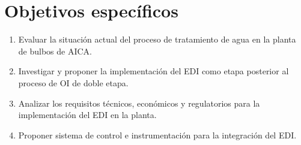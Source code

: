 \section*{Objetivos específicos}
\begin{enumerate}
    \item Evaluar la situación actual del proceso de tratamiento de agua en la planta de bulbos de AICA.
    \item Investigar y proponer la implementación del EDI como etapa posterior al proceso de OI de doble etapa.
    \item Analizar los requisitos técnicos, económicos y regulatorios para la implementación del EDI en la planta.
    \item Proponer sistema de control e instrumentación para la integración del EDI.
\end{enumerate}